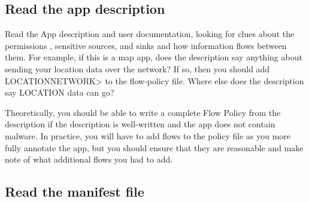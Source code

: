 \subsection{Read the app description}
\label{sec:read-the-app-description}

Read the App description and user documentation, looking for clues about
the permissions , sensitive sources, and sinks and how information
flows between them.  For example,
if this is a map app, does the description say anything about sending your location data over the
 network?  If so, then you should add \<LOCATION\flowsto NETWORK> to the flow-policy file.  Where
else does the description say LOCATION data can go?   

Theoretically, you should be able to write a complete Flow Policy from the
description if the description is well-written and the app does not contain
malware.  In practice, you will have to add flows to the policy file as you
more fully annotate the app, but you should ensure that they are reasonable
and make note of what additional flows you had to add.
 

\subsection{Read the manifest file}

